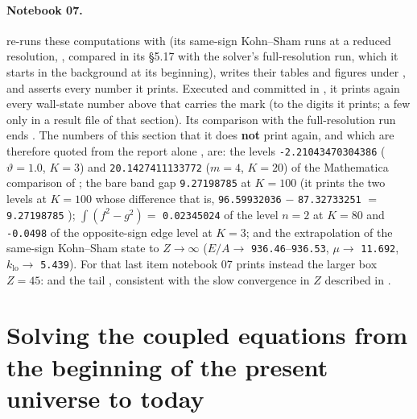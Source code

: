 \paragraph{Notebook 07.}  re-runs these
computations with  (its same-sign Kohn--Sham runs at a reduced resolution,
, compared in its \S5.17 with the solver's
full-resolution run, which it starts in the background at its beginning), writes their tables and figures
under , and asserts every number it prints. Executed and committed in
, it prints again every wall-state number above that carries the mark 
(to the digits it prints; a few only in a result file of that section). Its comparison with the
full-resolution run ends  . The numbers of
this section that it does \textbf{not} print again, and which are therefore quoted from the report alone
, are: the levels \texttt{-2.21043470304386} ($\vartheta=1.0$, $K=3$) and
\texttt{20.1427411133772} ($m=4$, $K=20$) of the Mathematica comparison of ; the bare band
gap \texttt{9.27198785} at $K=100$ (it prints the two levels at $K=100$ whose difference that is,
\texttt{96.59932036} $-$ \texttt{87.32733251} $=$ \texttt{9.27198785} \cfderived); $\int(f^2-g^2)=$
\texttt{0.02345024} of the level $n=2$ at $K=80$ and \texttt{-0.0498} of the opposite-sign edge level at
$K=3$; and the extrapolation of the same-sign Kohn--Sham state to $Z\to\infty$ ($E/A\to$
\texttt{936.46}--\texttt{936.53}, $\mu\to$ \texttt{11.692}, $k_{\mathrm{lo}}\to$ \texttt{5.439}). For that
last item notebook 07 prints instead the larger box $Z=45$: 
and the tail  ,
consistent with the slow convergence in $Z$ described in .

\section{Solving the coupled equations from the beginning of the present universe to today}
\label{sec:9}


